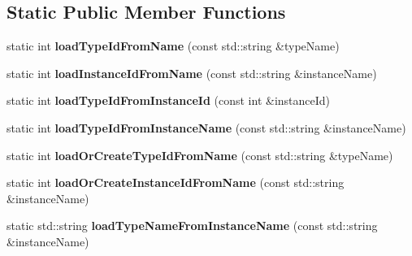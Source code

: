 \subsection*{Static Public Member Functions}
\begin{DoxyCompactItemize}
\item 
static int {\bfseries load\+Type\+Id\+From\+Name} (const std\+::string \&type\+Name)\hypertarget{classkukadu_1_1Hardware_a553cd9394cc78773c0effb7d80f0ee16}{}\label{classkukadu_1_1Hardware_a553cd9394cc78773c0effb7d80f0ee16}

\item 
static int {\bfseries load\+Instance\+Id\+From\+Name} (const std\+::string \&instance\+Name)\hypertarget{classkukadu_1_1Hardware_ac1f3b6662e4446c2dd67d702fccc8b7e}{}\label{classkukadu_1_1Hardware_ac1f3b6662e4446c2dd67d702fccc8b7e}

\item 
static int {\bfseries load\+Type\+Id\+From\+Instance\+Id} (const int \&instance\+Id)\hypertarget{classkukadu_1_1Hardware_a305c4f348e988d76e2cae7eb9105fec1}{}\label{classkukadu_1_1Hardware_a305c4f348e988d76e2cae7eb9105fec1}

\item 
static int {\bfseries load\+Type\+Id\+From\+Instance\+Name} (const std\+::string \&instance\+Name)\hypertarget{classkukadu_1_1Hardware_a6e5a6e1f250a02df3e9766801f82d255}{}\label{classkukadu_1_1Hardware_a6e5a6e1f250a02df3e9766801f82d255}

\item 
static int {\bfseries load\+Or\+Create\+Type\+Id\+From\+Name} (const std\+::string \&type\+Name)\hypertarget{classkukadu_1_1Hardware_aeb3c6a1ca42389cc341aee61c633daba}{}\label{classkukadu_1_1Hardware_aeb3c6a1ca42389cc341aee61c633daba}

\item 
static int {\bfseries load\+Or\+Create\+Instance\+Id\+From\+Name} (const std\+::string \&instance\+Name)\hypertarget{classkukadu_1_1Hardware_abfeecedf0a480422ea9d47da4f228c7b}{}\label{classkukadu_1_1Hardware_abfeecedf0a480422ea9d47da4f228c7b}

\item 
static std\+::string {\bfseries load\+Type\+Name\+From\+Instance\+Name} (const std\+::string \&instance\+Name)\hypertarget{classkukadu_1_1Hardware_a58f76f5117554f7f2613cdb082addf22}{}\label{classkukadu_1_1Hardware_a58f76f5117554f7f2613cdb082addf22}

\end{DoxyCompactItemize}

